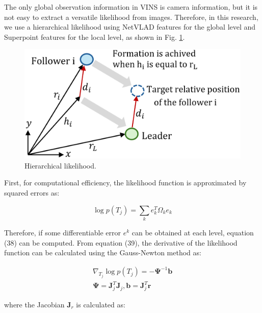 \documentclass[a4paper,fleqn,10pt,twocolumn]{SICE_ISCS}
\begin{document}
The only global observation information in VINS is camera information, but it is not easy to extract a versatile likelihood from images. Therefore, in this research, we use a hierarchical likelihood using NetVLAD features for the global level and Superpoint features for the local level, as shown in Fig. \ref{fig:hierarchical_likelihood}.

\begin{figure}[t]
	\begin{center}
		\includegraphics[width=\linewidth]{Fig/DefSymbol_(L-F).eps}
		\caption{Hierarchical likelihood.}
		\label{fig:hierarchical_likelihood}
	\end{center}
	\vspace{-2mm}
\end{figure}

First, for computational efficiency, the likelihood function is approximated by squared errors as:

\begin{equation}
\log p\left(T_{j}\right)=\sum_{k} e_{k}^{T} \Omega_{k} e_{k}
\end{equation}

Therefore, if some differentiable error $e^{k}$ can be obtained at each level, equation (38) can be computed. From equation (39), the derivative of the likelihood function can be calculated using the Gauss-Newton method as:

\begin{equation}
\begin{gathered}
\nabla_{T_{j}} \log p\left(T_{j}\right)=-\boldsymbol{\Psi}^{-1} \mathbf{b} \\
\boldsymbol{\Psi}=\mathbf{J}_{j}^{T} \mathbf{J}_{j}, \mathbf{b}=\mathbf{J}_{j}^{T} \mathbf{r}
\end{gathered}
\end{equation}

where the Jacobian $\mathbf{J}_{r}$ is calculated as:
\end{document}

